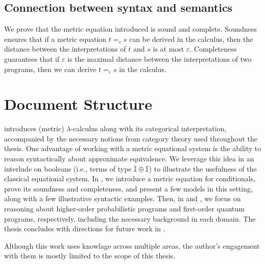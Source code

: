 \subsection*{Connection between syntax and semantics}
We prove that the metric equation introduced is sound and complete. Soundness ensures that if a metric equation $t =_{\varepsilon} s$ can be derived in the calculus, then the distance between the interpretations of $t$ and $s$ is at most $\varepsilon$. Completeness guarantees that if $\varepsilon$ is the maximal distance between the interpretations of two programs, then we can derive $t =_{\varepsilon} s$ in the calculus. 




\section{Document Structure}

 introduces (metric) $\lambda$-calculus along with its categorical interpretation, accompanied by the necessary notions from category theory used throughout the thesis. One advantage of working with a metric equational system is the ability to reason syntactically about approximate equivalence. We leverage this idea in an interlude on booleans (i.e., terms of type $\mathbb{I} \oplus \mathbb{I}$) to illustrate the usefulness of the classical equational system. In , we introduce a metric equation for conditionals, prove its soundness and completeness, and present a few models in this setting, along with a few illustrative syntactic examples. Then, in  and , we focus on reasoning about higher-order probabilistic programs and first-order quantum programs, respectively,  including the necessary background in each domain. The thesis concludes with directions for future work in .

Although this work uses knowlage across multiple areas, the author's engagement with them is mostly limited to the scope of this thesis.


